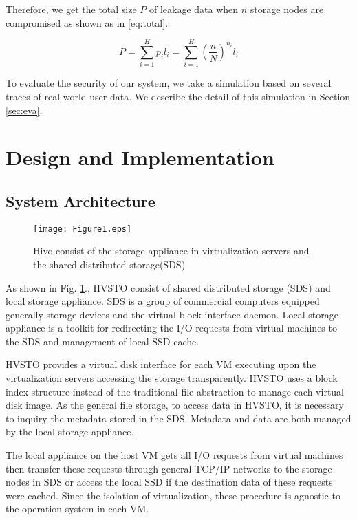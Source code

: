 \documentclass[conference]{IEEEtran}
\begin{document}
Therefore, we get the total size $P$ of leakage data when $n$ storage nodes are compromised as shown as in \ref{eq:total}.

\begin{equation}
\label{eq:total}
P = \sum_{i=1}^{H}p_i l_i = \sum_{i=1}^{H}(\frac{n}{N})^{n_i}l_i
\end{equation}

To evaluate the security of our system, we take a simulation based on several traces of real world user data. We describe the detail of this simulation in Section \ref{sec:eva}.










\section{Design and Implementation}
\label{sec:implementation}

\subsection{System Architecture}

\begin{figure}[!ht]
\centering
\texttt{[image: Figure1.eps]}
\caption{Hivo consist of the storage appliance in virtualization servers and the shared distributed storage(SDS)}
\label{figure:HVSTO}
\end{figure}
As shown in Fig. \ref{figure:HVSTO}., HVSTO consist of shared distributed storage (SDS) and local storage appliance. SDS is a group of commercial computers equipped generally storage devices and the virtual block interface daemon. Local storage appliance is a toolkit for redirecting the I/O requests from virtual machines to the SDS and management of local SSD cache.

HVSTO provides a virtual disk interface for each VM executing upon the virtualization servers accessing the storage transparently. HVSTO uses a block index structure instead of the traditional file abstraction to manage each virtual disk image. As the general file storage, to access data in HVSTO, it is necessary to inquiry the metadata stored in the SDS. Metadata and data are both managed by the local storage appliance.

The local appliance on the host VM gets all I/O requests from virtual machines then transfer these requests through general TCP/IP networks to the storage nodes in SDS or access the local SSD if the destination data of these requests were cached. Since the isolation of virtualization, these procedure is agnostic to the operation system in each VM.
\end{document}
